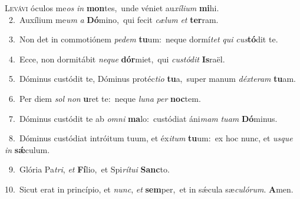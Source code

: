 \lettrine{\initial\textcolor{\initialcolor}{L}}{evávi} óculos me\textit{os} \textit{in} \textbf{mon}\-tes,~\star unde véniet au\-\textit{xí}\-\textit{li}\textit{um} \textbf{mi}\-hi.\\
{\numbfont\textcolor{\numbcolor}{~2.}}~Auxílium me\textit{um} \textit{a} \textbf{Dó}\-mino,~\star qui fecit \textit{cæ}\-\textit{lum} \textit{et} \textbf{ter}\-ram.\par
{\numbfont\textcolor{\numbcolor}{~3.}}~Non det in commotiónem \textit{pe}\-\textit{dem} \textbf{tu}\-um:~\star neque dormí\textit{tet} \textit{qui} \textit{cus}\-\textbf{tó}dit te.\par
{\numbfont\textcolor{\numbcolor}{~4.}}~Ecce, non dormitábit \textit{ne}\-\textit{que} \textbf{dór}\-miet,~\star qui \textit{cus}\-\textit{tó}\textit{dit} \textbf{Is}\-raël.\par
{\numbfont\textcolor{\numbcolor}{~5.}}~Dóminus custódit te, Dóminus protéc\-\textit{ti}\-\textit{o} \textbf{tu}\-a,~\star super manum \textit{déx}\-\textit{te}\textit{ram} \textbf{tu}\-am.\par
{\numbfont\textcolor{\numbcolor}{~6.}}~Per diem \textit{sol} \textit{non} \textbf{u}\-ret te:~\star neque \textit{lu}\-\textit{na} \textit{per} \textbf{noc}\-tem.\par
{\numbfont\textcolor{\numbcolor}{~7.}}~Dóminus custódit te ab \textit{om}\-\textit{ni} \textbf{ma}\-lo:~\star custódiat áni\textit{mam} \textit{tu}\-\textit{am} \textbf{Dó}\-minus.\par
{\numbfont\textcolor{\numbcolor}{~8.}}~Dóminus custódiat intróitum tuum, et éx\-\textit{i}\-\textit{tum} \textbf{tu}\-um:~\star ex hoc nunc, et \textit{us}\-\textit{que} \textit{in} \textbf{sǽ}\-culum.\par
{\numbfont\textcolor{\numbcolor}{~9.}}~Glória Pa\-\textit{tri}\-, \textit{et} \textbf{Fí}\-lio,~\star et Spi\-\textit{rí}\-\textit{tu}\textit{i} \textbf{Sanc}\-to.\par
{\numbfont\textcolor{\numbcolor}{10.}}~Sicut erat in princípio, et \textit{nunc}\-, \textit{et} \textbf{sem}\-per,~\star et in sǽcula sæ\-\textit{cu}\-\textit{ló}\textit{rum}. \textbf{A}\-men.\par

